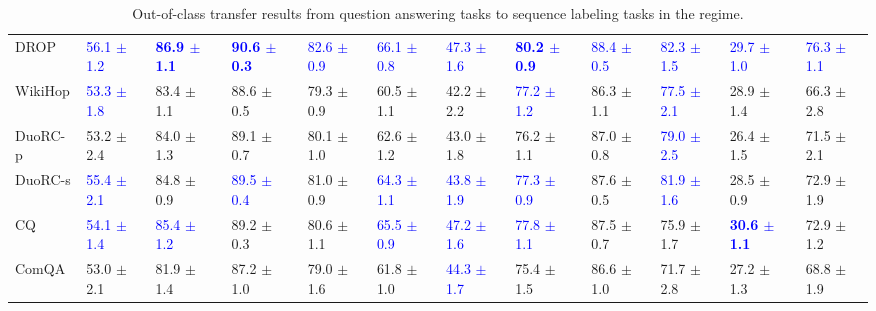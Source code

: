 \begin{landscape}
\begin{table}[t]
\begin{adjustbox}{max width=2\textwidth}
\begin{tabular}{ l l l l l  l l l l  l l l }
DROP & \textcolor{blue}{56.1 $\pm$ 1.2} & \textbf{\textcolor{blue}{86.9 $\pm$ 1.1}} & \textbf{\textcolor{blue}{90.6 $\pm$ 0.3}} & \textcolor{blue}{82.6 $\pm$ 0.9} & \textcolor{blue}{66.1 $\pm$ 0.8} & \textcolor{blue}{47.3 $\pm$ 1.6} & \textbf{\textcolor{blue}{80.2 $\pm$ 0.9}} & \textcolor{blue}{88.4 $\pm$ 0.5} & \textcolor{blue}{82.3 $\pm$ 1.5} & \textcolor{blue}{29.7 $\pm$ 1.0} & \textcolor{blue}{76.3 $\pm$ 1.1}\\
WikiHop & \textcolor{blue}{53.3 $\pm$ 1.8} & 83.4 $\pm$ 1.1 & 88.6 $\pm$ 0.5 & 79.3 $\pm$ 0.9 & 60.5 $\pm$ 1.1 & 42.2 $\pm$ 2.2 & \textcolor{blue}{77.2 $\pm$ 1.2} & 86.3 $\pm$ 1.1 & \textcolor{blue}{77.5 $\pm$ 2.1} & 28.9 $\pm$ 1.4 & 66.3 $\pm$ 2.8\\
DuoRC-p & 53.2 $\pm$ 2.4 & 84.0 $\pm$ 1.3 & 89.1 $\pm$ 0.7 & 80.1 $\pm$ 1.0 & 62.6 $\pm$ 1.2 & 43.0 $\pm$ 1.8 & 76.2 $\pm$ 1.1 & 87.0 $\pm$ 0.8 & \textcolor{blue}{79.0 $\pm$ 2.5} & 26.4 $\pm$ 1.5 & 71.5 $\pm$ 2.1\\
DuoRC-s & \textcolor{blue}{55.4 $\pm$ 2.1} & 84.8 $\pm$ 0.9 & \textcolor{blue}{89.5 $\pm$ 0.4} & 81.0 $\pm$ 0.9 & \textcolor{blue}{64.3 $\pm$ 1.1} & \textcolor{blue}{43.8 $\pm$ 1.9} & \textcolor{blue}{77.3 $\pm$ 0.9} & 87.6 $\pm$ 0.5 & \textcolor{blue}{81.9 $\pm$ 1.6} & 28.5 $\pm$ 0.9 & 72.9 $\pm$ 1.9\\
CQ & \textcolor{blue}{54.1 $\pm$ 1.4} & \textcolor{blue}{85.4 $\pm$ 1.2} & 89.2 $\pm$ 0.3 & 80.6 $\pm$ 1.1 & \textcolor{blue}{65.5 $\pm$ 0.9} & \textcolor{blue}{47.2 $\pm$ 1.6} & \textcolor{blue}{77.8 $\pm$ 1.1} & 87.5 $\pm$ 0.7 & 75.9 $\pm$ 1.7 & \textbf{\textcolor{blue}{30.6 $\pm$ 1.1}} & 72.9 $\pm$ 1.2\\
ComQA & 53.0 $\pm$ 2.1 & 81.9 $\pm$ 1.4 & 87.2 $\pm$ 1.0 & 79.0 $\pm$ 1.6 & 61.8 $\pm$ 1.0 & \textcolor{blue}{44.3 $\pm$ 1.7} & 75.4 $\pm$ 1.5 & 86.6 $\pm$ 1.0 & 71.7 $\pm$ 2.8 & 27.2 $\pm$ 1.3 & 68.8 $\pm$ 1.9\\
\bottomrule
\end{tabular}
\end{adjustbox}
\caption{Out-of-class transfer results from question answering tasks to sequence labeling tasks in the  regime.}
\label{tbla12b}
\end{table}
\end{landscape}